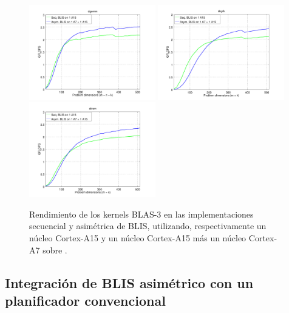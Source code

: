 \begin{figure}[t]
\centering
\includegraphics[width=0.49\textwidth]{Plots/BLIS_small/blis_dgemm_sym_asym}
\includegraphics[width=0.49\textwidth]{Plots/BLIS_small/blis_dsyrk_sym_asym}
\includegraphics[width=0.49\textwidth]{Plots/BLIS_small/blis_dtrsm_sym_asym}
\caption[Rendimiento de los kernels BLAS-3 en las implementaciones
secuencial y asimétrica de BLIS.]{Rendimiento de los kernels BLAS-3 en las
  implementaciones secuencial y asimétrica de BLIS, utilizando,
  respectivamente un núcleo Cortex-A15 y un núcleo Cortex-A15 más un núcleo
  Cortex-A7 sobre \odroid.}
\label{fig:cross_blis}
\end{figure}


\subsection{Integración de BLIS asimétrico con un planificador convencional}

